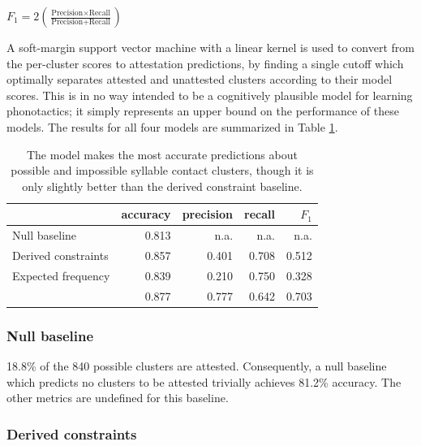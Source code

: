 \begin{unlabeledexample}
$\displaystyle F_1 = 2 \left( \frac{\textrm{Precision} \times \textrm{Recall}}{\textrm{Precision} + \textrm{Recall}}\right)$
\end{unlabeledexample}

A soft-margin support vector machine \citep{Cortes1995} with a linear kernel is used to convert from the per-cluster scores to attestation predictions, by finding a single cutoff which optimally separates attested and unattested clusters according to their model scores. This is in no way intended to be a cognitively plausible model for learning phonotactics; it simply represents an upper bound on the performance of these models. The results for all four models are summarized in Table \ref{cmresults}.

\begin{table} \centering
\begin{tabular}{l | r r r r}
\toprule
                          & accuracy & precision & recall & $F_1$ \\
\midrule
Null baseline             & 0.813    & n.a.      & n.a.   & n.a.  \\
Derived constraints       & 0.857    & 0.401     & 0.708  & 0.512 \\
Expected frequency        & 0.839    & 0.210     & 0.750  & 0.328 \\
\citet{Hayes2008a}        & 0.877    & 0.777     & 0.642  & 0.703 \\
\bottomrule
\end{tabular}
\caption{The \citeauthor{Hayes2008a} model makes the most accurate predictions about possible and impossible syllable contact clusters, though it is only slightly better than the derived constraint baseline.}
\label{cmresults}
\end{table}

\subsubsection{Null baseline}

18.8\% of the 840 possible clusters are attested. Consequently, a null baseline which predicts no clusters to be attested trivially achieves 81.2\% accuracy. The other metrics are undefined for this baseline.

\subsubsection{Derived constraints}

